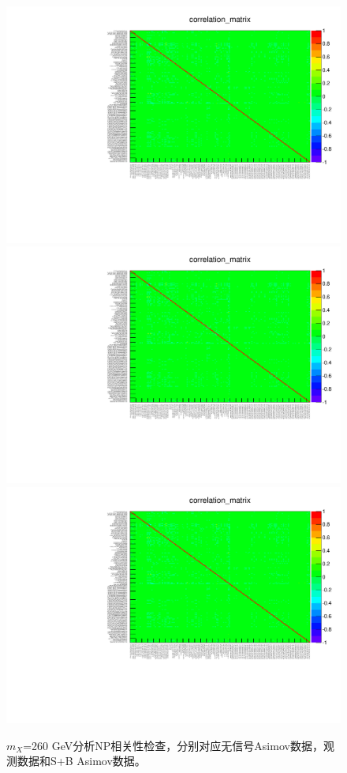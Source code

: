 \begin{figure}
\centering
\includegraphics[width=.35\textwidth, angle=-90]{fig/Statistical/combination/corr-exp-combined-mH260.pdf}
\includegraphics[width=.35\textwidth, angle=-90]{fig/Statistical/combination/corr-obs-combined-mH260.pdf}\\
\includegraphics[width=.35\textwidth, angle=-90]{fig/Statistical/combination/corr-exp-combined-mH260_mu1.pdf}
\caption{$m_X$=260 GeV分析NP相关性检查，分别对应无信号Asimov数据，观测数据和S+B Asimov数据。}
\label{fig:corr-comb-260}
\end{figure}

